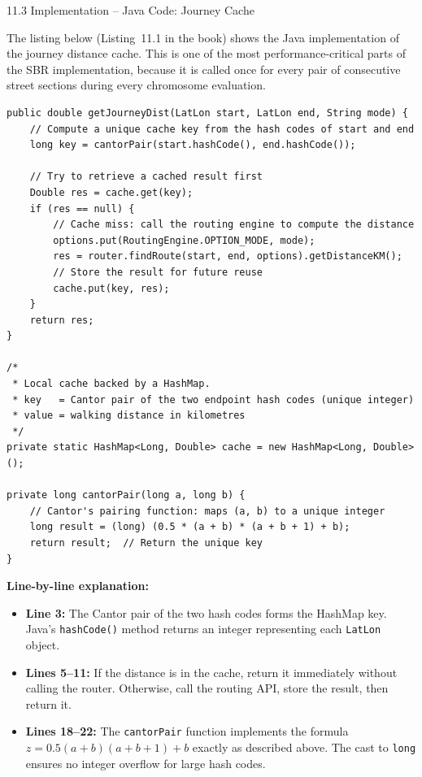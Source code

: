 \documentclass[aspectratio=169,10pt]{beamer}
\begin{document}
\begin{frame}[fragile]{11.3 Implementation -- Java Code: Journey Cache}

  The listing below (Listing~11.1 in the book) shows the Java implementation
  of the journey distance cache.  This is one of the most performance-critical
  parts of the SBR implementation, because it is called once for every pair
  of consecutive street sections during every chromosome evaluation.

\begin{lstlisting}[style=java]
public double getJourneyDist(LatLon start, LatLon end, String mode) {
    // Compute a unique cache key from the hash codes of start and end
    long key = cantorPair(start.hashCode(), end.hashCode());

    // Try to retrieve a cached result first
    Double res = cache.get(key);
    if (res == null) {
        // Cache miss: call the routing engine to compute the distance
        options.put(RoutingEngine.OPTION_MODE, mode);
        res = router.findRoute(start, end, options).getDistanceKM();
        // Store the result for future reuse
        cache.put(key, res);
    }
    return res;
}

/*
 * Local cache backed by a HashMap.
 * key   = Cantor pair of the two endpoint hash codes (unique integer)
 * value = walking distance in kilometres
 */
private static HashMap<Long, Double> cache = new HashMap<Long, Double>();

private long cantorPair(long a, long b) {
    // Cantor's pairing function: maps (a, b) to a unique integer
    long result = (long) (0.5 * (a + b) * (a + b + 1) + b);
    return result;  // Return the unique key
}
\end{lstlisting}

  \textbf{Line-by-line explanation:}
  \begin{itemize}
    \item \textbf{Line 3:} The Cantor pair of the two hash codes forms the
          HashMap key.  Java's \texttt{hashCode()} method returns an integer
          representing each \texttt{LatLon} object.
    \item \textbf{Lines 5--11:} If the distance is in the cache, return it
          immediately without calling the router.  Otherwise, call the
          routing API, store the result, then return it.
    \item \textbf{Lines 18--22:} The \texttt{cantorPair} function implements
          the formula $z = 0.5(a+b)(a+b+1) + b$ exactly as described above.
          The cast to \texttt{long} ensures no integer overflow for large
          hash codes.
  \end{itemize}

\end{frame}
\end{document}
